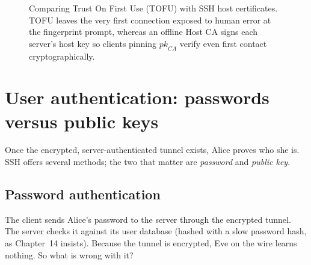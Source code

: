 \begin{figure}[H]
\caption{Comparing Trust On First Use (TOFU) with SSH host certificates. TOFU leaves the very first connection exposed to human error at the fingerprint prompt, whereas an offline Host CA signs each server's host key so clients pinning $\textit{pk}_{CA}$ verify even first contact cryptographically.}
\label{ch28:fig-tofu-vs-ca}
\end{figure}

\section{User authentication: passwords versus public keys}

Once the encrypted, server-authenticated tunnel exists, Alice proves who she is. SSH offers several methods; the two that matter are \emph{password} and \emph{public key}.

\subsection{Password authentication}

The client sends Alice's password to the server through the encrypted tunnel. The server checks it against its user database (hashed with a slow password hash, as Chapter~14 insists). Because the tunnel is encrypted, Eve on the wire learns nothing. So what is wrong with it?

